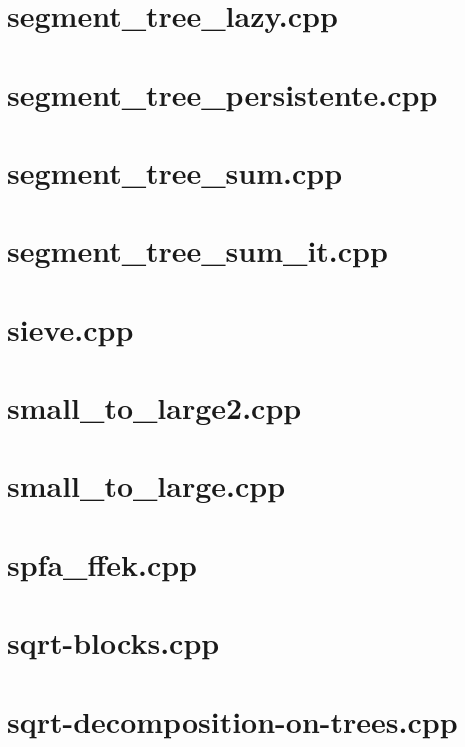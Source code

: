 \documentclass[a4paper,12pt]{article}
\begin{document}
\section{segment_tree_lazy.cpp}


\section{segment_tree_persistente.cpp}


\section{segment_tree_sum.cpp}


\section{segment_tree_sum_it.cpp}


\section{sieve.cpp}


\section{small_to_large2.cpp}


\section{small_to_large.cpp}


\section{spfa_ffek.cpp}


\section{sqrt-blocks.cpp}


\section{sqrt-decomposition-on-trees.cpp}

\end{document}
